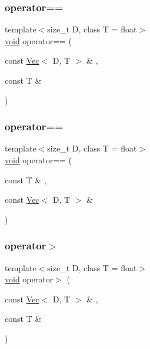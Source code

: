 \subsubsection{\texorpdfstring{operator==}{operator==}\hspace{0.1cm}{\footnotesize\ttfamily [1/2]}}
{\footnotesize\ttfamily template$<$size\+\_\+t D, class T = float$>$ \\
\hyperlink{namespacetrimesh_a784ddfd979e1c579bda795a8edfc3f43}{void} operator== (\begin{DoxyParamCaption}\item[{const \hyperlink{classtrimesh_1_1Vec}{Vec}$<$ D, T $>$ \&}]{,  }\item[{const T \&}]{ }\end{DoxyParamCaption})\hspace{0.3cm}{\ttfamily [friend]}}

\mbox{\label{classtrimesh_1_1Vec_aa5a538a9fb73946af34ad539d9c89afc}} 
\subsubsection{\texorpdfstring{operator==}{operator==}\hspace{0.1cm}{\footnotesize\ttfamily [2/2]}}
{\footnotesize\ttfamily template$<$size\+\_\+t D, class T = float$>$ \\
\hyperlink{namespacetrimesh_a784ddfd979e1c579bda795a8edfc3f43}{void} operator== (\begin{DoxyParamCaption}\item[{const T \&}]{,  }\item[{const \hyperlink{classtrimesh_1_1Vec}{Vec}$<$ D, T $>$ \&}]{ }\end{DoxyParamCaption})\hspace{0.3cm}{\ttfamily [friend]}}

\mbox{\label{classtrimesh_1_1Vec_afd9f6edbf4e133b4fe87d4720d09eb38}} 
\subsubsection{\texorpdfstring{operator$>$}{operator>}\hspace{0.1cm}{\footnotesize\ttfamily [1/2]}}
{\footnotesize\ttfamily template$<$size\+\_\+t D, class T = float$>$ \\
\hyperlink{namespacetrimesh_a784ddfd979e1c579bda795a8edfc3f43}{void} operator$>$ (\begin{DoxyParamCaption}\item[{const \hyperlink{classtrimesh_1_1Vec}{Vec}$<$ D, T $>$ \&}]{,  }\item[{const T \&}]{ }\end{DoxyParamCaption})\hspace{0.3cm}{\ttfamily [friend]}}

